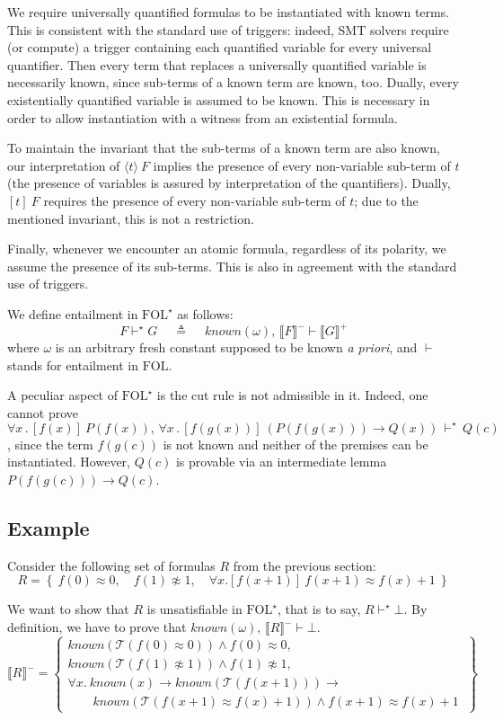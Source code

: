 \documentclass[]{easychair}
\newcommand{\terms}{\mathcal{T}}
\newcommand{\Fm}[1]{\llb #1 \rrb^-}
\newcommand{\Fp}[1]{\llb #1 \rrb^+}
\newcommand{\K}{\mathit{known}}
\newcommand{\bb}{\omega}
\newcommand{\FOL}{\mathrm{FOL}}
\newcommand{\FOLT}{\mathrm{FOL}^\star}
\newcommand{\iFOLT}{\vdash^\star}
\newcommand{\iFOL}{\vdash}
\newcommand{\la}{\langle} \newcommand{\ra}{\rangle}
\newcommand{\llb}{\llbracket} \newcommand{\rrb}{\rrbracket}
\newcommand{\eqdef}{\:\triangleq\:}
\newcommand{\beforesub}{\vspace{0cm}}
\newcommand{\aftersub}{\vspace{0cm}}
\begin{document}
We require universally quantified formulas to be instantiated
with known terms. This is consistent with the standard use of triggers:
indeed, SMT solvers require (or compute) a trigger containing each
quantified variable for every universal quantifier.
Then every term that replaces a universally quantified variable is
necessarily known, since sub-terms of a known term are known, too.
Dually, every existentially quantified variable is assumed to be
known. This is necessary in order to allow instantiation
with a witness from an existential formula.

To maintain the invariant that the sub-terms of a known term are
also known, our interpretation of $\la t\ra~F$ implies the presence
of every non-variable sub-term of $t$ (the presence of variables
is assured by interpretation of the quantifiers). Dually, $[t]~F$
requires the presence of every non-variable sub-term of $t$;
due to the mentioned invariant, this is not a restriction.

Finally, whenever we encounter an atomic formula, regardless
of its polarity, we assume the presence of its sub-terms.
This is also in agreement with the standard use of triggers.

We define entailment in $\FOLT$ as follows:
$$F \iFOLT G \quad \eqdef \quad \K(\bb),\,\Fm{F}\iFOL\Fp{G}$$
where $\bb$ is an arbitrary fresh constant supposed to be known
\emph{a priori}, and $\iFOL$ stands for entailment in $\FOL$.

A peculiar aspect of $\FOLT$ is the cut rule is not admissible in it.
Indeed, one cannot prove
$\forall x\,.\,[f(x)]\:P(f(x)),\,
\forall x\,.\,[f(g(x))]\:(P(f(g(x))) \to Q(x)) \,\iFOLT\, Q(c)$,
since the term $f(g(c))$ is not known and neither of the premises
can be instantiated.
However, $Q(c)$ is provable via an intermediate lemma
$P(f(g(c))) \to Q(c)$.

\beforesub
\subsection{\label{ssec:example} Example}
\aftersub

Consider the following set of formulas $R$ from the previous section:
\[R=\left\{\ f(0) \approx 0,\quad f(1) \not\approx 1,\quad \forall
x.[f(x+1)]~f(x+1) \approx f(x)+1\ \right\}\]

We want to show that $R$ is unsatisfiable in $\FOLT$, that is to say,
$R\iFOLT\bot$. By definition, we have to prove that
$\K(\bb),\,\Fm{R}\iFOL\bot$.
\[
\Fm{R} =
\left\{\begin{array}{l}
    \K(\terms(f(0)\approx 0)) \wedge f(0)\approx 0, \\[0.3em]
    \K(\terms(f(1)\not\approx 1)) \wedge f(1) \not\approx 1, \\[0.3em]
    \forall x.~ \K(x) \to \K(\terms(f(x+1))) \to {} \\
    \qquad  \K(\terms(f(x+1)\approx f(x)+1)) \wedge f(x+1)
\approx f(x)+1\end{array}\ \right\}\]
\end{document}
